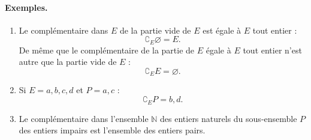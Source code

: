 \documentclass[12pt,parskip=full,chapterprefix=true,a5paper]{scrbook}
\begin{document}
\paragraph{Exemples.}
  \begin{enumerate}
  \item Le complémentaire dans \(E\) de la partie vide de \(E\) est égale à \(E\) tout entier :
    \[
      \complement_E\varnothing=E.
    \]
    De même que le complémentaire de la partie de \(E\) égale à \(E\) tout entier n'est autre que la partie vide de \(E\) :
    \[
      \complement_EE=\varnothing.
    \]
  \item Si \(E={a,b,c,d}\) et \(P={a,c}\) :
    \[
      \complement_EP={b,d}.
    \]
    \item Le complémentaire dans l'ensemble \(\mathbb{N}\) des entiers naturels du sous-ensemble \(P\) des entiers impairs est l'ensemble des entiers pairs.
    \end{enumerate}
    
  
\end{document}
